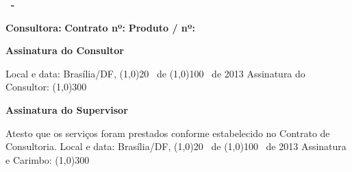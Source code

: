 \textbf{\ProjectCode \ -} \ProductDescription

\vspace{3cm}

\begin{minipage}{0.5\textwidth}
  \textbf{Consultora: \MyName}
  \newline
  \textbf{Contrato nº: \ContractNumber}
  \newline
  \textbf{Produto / nº: \ProductNumber}
\end{minipage}

\vspace{2cm}

\textbf{Assinatura do Consultor}

\begin{framed}
Local e data: Brasília/DF, \line(1,0){20} \ de \line(1,0){100} \ de 2013
\newline
\newline
Assinatura do Consultor: \line(1,0){300}
\end{framed}

\vspace{1cm}

\textbf{Assinatura do Supervisor}

\begin{framed}
Atesto que os serviços foram prestados conforme estabelecido no Contrato
de Consultoria.
\newline
\newline
Local e data: Brasília/DF, \line(1,0){20} \ de \line(1,0){100} \ de 2013
\newline
\newline
Assinatura e Carimbo: \line(1,0){300}
\end{framed}
